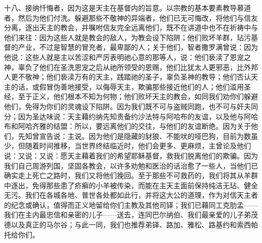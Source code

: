十八、接纳忏悔者，因为这是天主在基督内的旨意。以宗教的基本要素教导慕道者，然后为他们付洗。躲避那些不敬神的异端者，他们已无可悔改，将他们与信友分离，逐出天主的教会，并嘱咐信友完全远离他们，既不在讲道中也不在祈祷中与他们来往：因为这些人就是教会的敌人，为教会设下陷阱；他们败坏羊群，玷污基督的产业，不过是智慧的冒充者，最卑鄙的人；关于他们，智者撒罗满曾说：因为他说：这些人就是主以苦涩和严厉表明祂心意的那等人，说：他们亵渎了恩宠之神，辜负了他们在圣洗恩宠之后从祂所领受的恩赐，他们比犹太人更邪恶，比外邦人更不敬神；他们亵渎万有的天主，践踏祂的圣子，辜负圣神的教导；他们否认天主的话，或假冒伪善地接受，以侮辱天主，欺骗那些接近他们的人；他们滥用圣经，至于正义，他们根本不知为何物；他们败坏天主的教会，如同我们劝你们躲避他们，免得为你们的灵魂设下陷阱。因为我们既不可与盗贼同跑，也不可与奸夫同分；因为圣达味说：天主藉约纳先知责备约沙法特与阿哈布的友谊，以及他与阿哈布和阿哈齐雅的结盟：所以，要远离他们的交往，与他们的友谊断绝。因为关于他们，先知曾宣告说：主说。因为他们是隐藏的豺狼、不能吠的哑巴狗，目前为数虽少，但随着时间推移，当世界终结临近时，他们会更多、更麻烦，主曾论及他们说：又说：又说：愿天主藉着我们的希望耶稣基督，救我们脱离他们的欺骗。因为我们自己周游列国，坚固各教会，以许多劝勉和医治的话治愈了一些人，当他们已确实走上死亡之路时，我们又将他们挽回。至于那些不可救药的，我们将其从羊群中逐出，免得那些患了疥癣的小羊被传染，而能在主天主面前保持纯洁无玷、健全无污。我们在各城各地、普世各处都如此行，并将这大公的道理，作为对信天主者的纪念或确认，值得而正义地留给你们主教及其他司铎；我们已藉同工克肋孟——我们在主内最忠信和亲密的儿子——送去，连同巴尔纳伯、我们最亲爱的儿子弟茂德以及真正的马尔谷；与此一同，我们也推荐弟铎、路加、雅松、路基约和索西帕托给你们。\par



